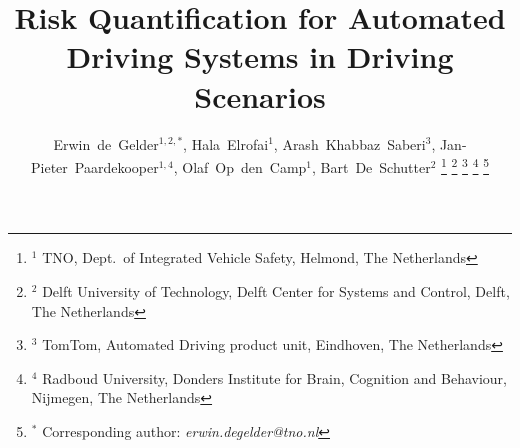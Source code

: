 \documentclass[journal]{IEEEtran}
\theoremstyle{remark}\newtheorem{remarkenv}{Remark}        %
\begin{document}
\date{}

\title{Risk Quantification for Automated Driving Systems in Driving Scenarios}

\author{Erwin~de~Gelder$^{1,2,*}$,
	    Hala~Elrofai$^{1}$,
	    Arash~Khabbaz~Saberi$^{3}$,
	    Jan-Pieter~Paardekooper$^{1,4}$,
	    Olaf~Op~den~Camp$^{1}$,
	    Bart~De~Schutter$^{2}$%
\thanks{$^1$ TNO, Dept.\ of Integrated Vehicle Safety, Helmond, The Netherlands}%
\thanks{$^2$ Delft University of Technology, Delft Center for Systems and Control, Delft, The Netherlands}%
\thanks{$^3$ TomTom, Automated Driving product unit, Eindhoven, The Netherlands}%
\thanks{$^4$ Radboud University, Donders Institute for Brain, Cognition and Behaviour, Nijmegen, The Netherlands}%
\thanks{$^*$ Corresponding author: \textit{erwin.degelder@tno.nl}}}%

\maketitle

\acresetall





\acresetall





\printbibliography
\end{document}
